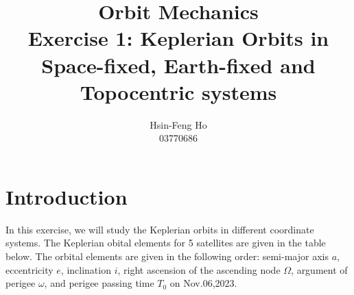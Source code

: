 \documentclass[12pt
,headinclude
,headsepline
,bibtotocnumbered
]{scrartcl}
\begin{document}
\begin{titlepage}
    \vspace{\fill}
    \title{\textbf{Orbit Mechanics \\ Exercise 1: Keplerian Orbits in Space-fixed, Earth-fixed and Topocentric systems}}
    \vspace{5cm}
    \author{Hsin-Feng Ho\\
    03770686}
    \vspace{3cm}
    \maketitle
\end{titlepage}
\section{Introduction}
In this exercise, we will study the Keplerian orbits in different coordinate systems. The Keplerian obital elements for 5 satellites are given in the table below. The orbital elements are given in the following order: semi-major axis $a$, eccentricity $e$, inclination $i$, right ascension of the ascending node $\Omega$, argument of perigee $\omega$, and perigee passing time $T_0$ on Nov.06,2023.
\begin{table}[H]
\centering
\renewcommand\arraystretch{1.5}
\end{table}
\end{document}
